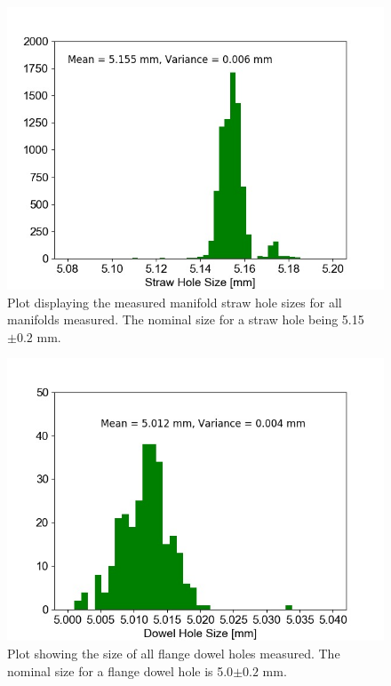 \begin{figure}[ht]
\centering 
\includegraphics[scale=0.6]{Figures/strawholesizes.jpeg}
\decoRule
\caption{Plot displaying the measured manifold straw hole sizes for all manifolds measured. The nominal size for a straw hole being 5.15$\pm0.2$ mm. }
\label{fig:strawholesizes}
\end{figure}

\begin{figure}[ht]
\centering 
\includegraphics[scale=0.6]{Figures/dowelholesizes.jpeg}
\decoRule
\caption{Plot showing the size of all flange dowel holes measured. The nominal size for a flange dowel hole is 5.0$\pm0.2$ mm.}
\label{fig:dowelholesizes}
\end{figure}

